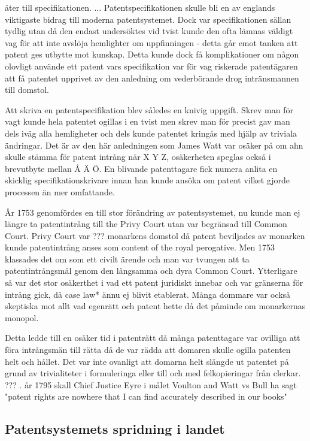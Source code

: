 åter till specifikationen. ... 
Patentspecifikationen skulle bli en av englands viktigaste bidrag till moderna patentsystemet. Dock var specifikationen sällan tydlig utan då den endast undersöktes vid tvist kunde den ofta lämnas väldigt vag för att inte avslöja hemlighter om uppfinningen - detta går emot tanken att patent ges utbytte mot kunskap. Detta kunde dock få komplikationer om någon olovligt använde ett patent vars specifikation var för vag riskerade patentägaren att få patentet upprivet av den anledning om vederbörande drog intränsmannen till domstol. 

Att skriva en patentspecifikation blev således en knivig uppgift. Skrev man för vagt kunde hela patentet ogillas i en tvist men skrev man för precist gav man dels iväg alla hemligheter och dels kunde patentet kringås med hjälp av triviala ändringar. Det är av den här anledningen som James Watt var osäker på om ahn skulle stämma för patent intrång när X Y Z, osäkerheten speglas också i brevutbyte mellan Å Ä Ö. En blivande patenttagare fick numera anlita en skicklig specifikationskrivare innan han kunde ansöka om patent vilket gjorde processen än mer omfattande.

År 1753 genomfördes en till stor förändring av patentsystemet, nu kunde man ej längre ta patentintrång till the Privy Court utan var begränsad till Common Court. Privy Court var ??? monarkens domstol då patent beviljades av monarken kunde patentintrång anses som content of the royal perogative. Men 1753 klassades det om som ett civilt ärende och man var tvungen att ta patentintrångsmål genom den långsamma och dyra Common Court. Ytterligare så var det stor osäkerthet i vad ett patent juridiskt innebar och var gränserna för intrång gick, då case law* ännu ej blivit etablerat. Många dommare var också skeptiska mot allt vad egenrätt och patent hette då det påminde om monarkernas monopol.

Detta ledde till en osäker tid i patenträtt då många patenttagare var ovilliga att föra intrångsmän till rätta då de var rädda att domaren skulle ogilla patenten helt och hållet. Det var inte ovanligt att domarna helt slängde ut patentet på grund av trivialiteter i formuleringa eller till och med felkopieringar från clerkar. ??? . år 1795 skall Chief Justice Eyre i målet Voulton and Watt vs Bull ha sagt "patent rights are nowhere 
that I can find accurately described in our books"


\subsection{Patentsystemets spridning i landet} %
\label{sub:patentsystemets_spridning_i_landet}

